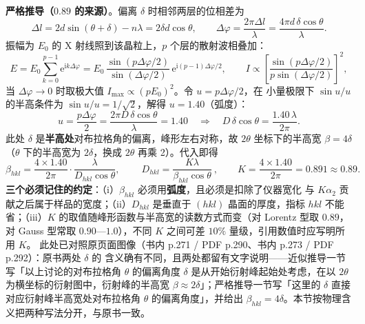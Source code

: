 \begin{principle}
\textbf{严格推导（$0.89$ 的来源）}。偏离 $\delta$ 时相邻两层的位相差为
\begin{equation}
\Delta l=2d\sin(\theta+\delta)-n\lambda=2\delta d\cos\theta,
\qquad
\Delta\varphi=\frac{2\pi\Delta l}{\lambda}=\frac{4\pi d\,\delta\cos\theta}{\lambda}.
\label{eq:ch04c-dphi}
\end{equation}
振幅为 $E_{0}$ 的 X 射线照到该晶粒上，$p$ 个层的散射波相叠加：
\begin{equation}
E=E_{0}\sum_{k=0}^{p-1}\mathrm{e}^{\mathrm{i}k\Delta\varphi}
=E_{0}\,\frac{\sin\left(p\Delta\varphi/2\right)}{\sin\left(\Delta\varphi/2\right)}\,
\mathrm{e}^{\mathrm{i}(p-1)\Delta\varphi/2},
\qquad
I\propto\left[\frac{\sin\left(p\Delta\varphi/2\right)}{p\sin\left(\Delta\varphi/2\right)}\right]^{2},
\label{eq:ch04c-sum}
\end{equation}
当 $\Delta\varphi\to0$ 时取极大值 $I_{\max}\propto(pE_{0})^{2}$。令 $u=p\Delta\varphi/2$，在
小量极限下 $\sin u/u$ 的半高条件为 $\sin u/u=1/\sqrt{2}$，解得 $u=1.40$（弧度）：
\begin{equation}
u=\frac{p\Delta\varphi}{2}=\frac{2\pi D\,\delta\cos\theta}{\lambda}=1.40
\quad\Longrightarrow\quad
D\,\delta\cos\theta=\frac{1.40\,\lambda}{2\pi}.
\label{eq:ch04c-u}
\end{equation}
此处 $\delta$ 是\textbf{半高处}对布拉格角的偏离，峰形左右对称，故 $2\theta$ 坐标下的半高宽
$\beta=4\delta$（$\theta$ 下的半高宽为 $2\delta$，换成 $2\theta$ 再乘 2）。代入即得
\begin{equation}
\beta_{hkl}=\frac{4\times1.40}{2\pi}\cdot\frac{\lambda}{D_{hkl}\cos\theta},
\qquad
\boxed{\ D_{hkl}=\frac{K\lambda}{\beta_{hkl}\cos\theta}\ },\qquad
K=\frac{4\times1.40}{2\pi}=0.891\approx0.89 .
\label{eq:ch04c-scherrer}
\end{equation}
\textbf{三个必须记住的约定}：（i）$\beta_{hkl}$ 必须用\textbf{弧度}，且必须是扣除了仪器宽化
与 $K\alpha_{2}$ 贡献之后属于样品的宽度；（ii）$D_{hkl}$ 是垂直于 $(hkl)$ 晶面的厚度，指标
$hkl$ 不能省；（iii）$K$ 的取值随峰形函数与半高宽的读数方式而变（对 Lorentz 型取 $0.89$，
对 Gauss 型常取 $0.90$—$1.0$），不同 $K$ 之间可差 $10\%$ 量级，引用数值时应写明所用 $K$。
此处已对照原页面图像（书内 p.271 / PDF p.290、书内 p.273 / PDF p.292）：原书两处 $\delta$ 的
含义确有不同，且两处都留有文字说明——近似推导一节写「以上讨论的对布拉格角 $\theta$ 的偏离角度
$\delta$ 是从开始衍射峰起始处考虑，在以 $2\theta$ 为横坐标的衍射图中，衍射峰的半高宽
$\beta\approx2\delta$」；严格推导一节写「这里的 $\delta$ 直接对应衍射峰半高宽处对布拉格角
$\theta$ 的偏离角度」，并给出 $\beta_{hkl}=4\delta$。本节按物理含义把两种写法分开，与原书一致。
\end{principle}

